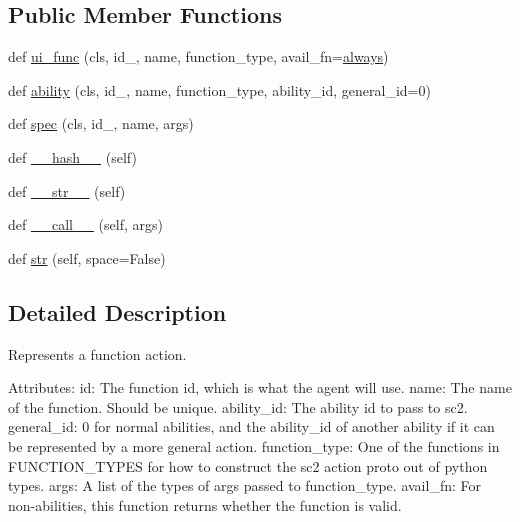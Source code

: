 \subsection*{Public Member Functions}
\begin{DoxyCompactItemize}
\item 
def \mbox{\hyperlink{classpysc2_1_1lib_1_1actions_1_1_function_a2c4bb777e80bd4cdeaa012e85f85b4be}{ui\+\_\+func}} (cls, id\+\_\+, name, function\+\_\+type, avail\+\_\+fn=\mbox{\hyperlink{namespacepysc2_1_1lib_1_1actions_ae1dc5f547908d78c7367d3c734b29a59}{always}})
\item 
def \mbox{\hyperlink{classpysc2_1_1lib_1_1actions_1_1_function_afa5332609b8f6e69057a0035add0a480}{ability}} (cls, id\+\_\+, name, function\+\_\+type, ability\+\_\+id, general\+\_\+id=0)
\item 
def \mbox{\hyperlink{classpysc2_1_1lib_1_1actions_1_1_function_a640d6d3480535d03e1b11cd4314ab221}{spec}} (cls, id\+\_\+, name, args)
\item 
def \mbox{\hyperlink{classpysc2_1_1lib_1_1actions_1_1_function_a31e8c8775ce3b7d55671b1494502aca7}{\+\_\+\+\_\+hash\+\_\+\+\_\+}} (self)
\item 
def \mbox{\hyperlink{classpysc2_1_1lib_1_1actions_1_1_function_a693e39932ef61edb079e977f8636626e}{\+\_\+\+\_\+str\+\_\+\+\_\+}} (self)
\item 
def \mbox{\hyperlink{classpysc2_1_1lib_1_1actions_1_1_function_a82d083b88887fb4c9fa6dd99a399cedc}{\+\_\+\+\_\+call\+\_\+\+\_\+}} (self, args)
\item 
def \mbox{\hyperlink{classpysc2_1_1lib_1_1actions_1_1_function_a98ad5ff5cc2cbd2656c25dbf0d60c8a4}{str}} (self, space=False)
\end{DoxyCompactItemize}


\subsection{Detailed Description}
\begin{DoxyVerb}Represents a function action.

Attributes:
  id: The function id, which is what the agent will use.
  name: The name of the function. Should be unique.
  ability_id: The ability id to pass to sc2.
  general_id: 0 for normal abilities, and the ability_id of another ability if
      it can be represented by a more general action.
  function_type: One of the functions in FUNCTION_TYPES for how to construct
      the sc2 action proto out of python types.
  args: A list of the types of args passed to function_type.
  avail_fn: For non-abilities, this function returns whether the function is
      valid.
\end{DoxyVerb}
 

